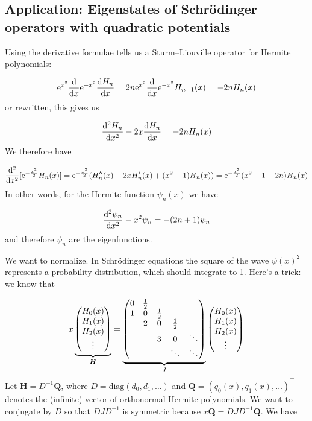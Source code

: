 \documentclass[12pt,a4paper]{article}
\def\half{ {1 \over 2} }
\def\D{ {\rm d} }
\def\E{ {\rm e} }
\def\dx{\D x}
\def\endash{–}
\begin{document}
\subsection{Application:  Eigenstates of Schrödinger operators with quadratic potentials}
Using the derivative formulae tells us a Sturm\ensuremath{\endash}Liouville operator for Hermite polynomials:

\[
\E^{x^2} {\D \over \dx} \E^{-x^2} {\D H_n \over \dx} = 2n \E^{x^2} {\D \over \dx} \E^{-x^2} H_{n-1}(x) = -2nH_n(x)
\]
or rewritten, this gives us

\[
{\D^2 H_n \over \dx^2} -2x {\D H_n \over \dx} = -2nH_n(x)
\]
We therefore have

\[
{\D^2 \over \dx^2}[\E^{-{x^2 \over 2}} H_n(x)] = \E^{-{x^2 \over 2}} (H_n''(x)  -2x H_n'(x) + (x^2-1) H_n(x)) = \E^{-{x^2 \over 2}} (x^2-1-2n) H_n(x)
\]
In other words, for the Hermite function $\psi_n(x)$ we have

\[
{\D^2 \psi_n \over \dx^2} -x^2 \psi_n = -(2n+1) \psi_n
\]
and therefore $\psi_n$ are the eigenfunctions.

We want to normalize.  In Schrödinger equations the square of the wave $\psi(x)^2$ represents a probability distribution, which should integrate to 1. Here's a trick: we know that

\[
x \underbrace{\begin{pmatrix} H_0(x) \\ H_1(x) \\ H_2(x) \\ \vdots \end{pmatrix}}_{\bm{H}} = \underbrace{\begin{pmatrix} 0 & {1 \over 2} \\
1 & 0 & \half \\
& 2 & 0 & \half \\
&& 3 & 0 & \ddots \\
&&& \ddots & \ddots
\end{pmatrix}}_J\begin{pmatrix} H_0(x) \\ H_1(x) \\ H_2(x) \\ \vdots \end{pmatrix}
\]
Let $\bm{H} = D^{-1}\bm{Q}$, where $D = \mathrm{diag}(d_0, d_1, \ldots)$ and $\bm{Q} = \left(q_0(x), q_1(x), \ldots \right)^\top$ denotes the (infinite) vector of orthonormal Hermite polynomials. We want to conjugate by $D$ so that $DJD^{-1}$ is symmetric because $x\bm{Q} = DJD^{-1}\bm{Q}$. We have
\end{document}
